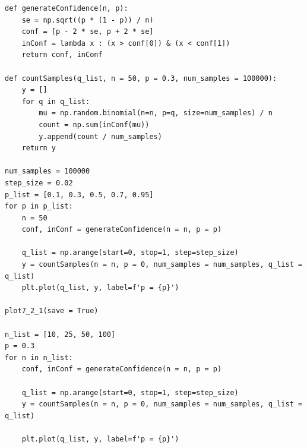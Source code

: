 \documentclass{article}
\begin{document}
\begin{enumerate}
\begin{itemize}
\begin{verbatim}
def generateConfidence(n, p):
    se = np.sqrt((p * (1 - p)) / n)
    conf = [p - 2 * se, p + 2 * se]
    inConf = lambda x : (x > conf[0]) & (x < conf[1])
    return conf, inConf

def countSamples(q_list, n = 50, p = 0.3, num_samples = 100000):
    y = []
    for q in q_list:
        mu = np.random.binomial(n=n, p=q, size=num_samples) / n
        count = np.sum(inConf(mu))
        y.append(count / num_samples)
    return y

num_samples = 100000
step_size = 0.02
p_list = [0.1, 0.3, 0.5, 0.7, 0.95]
for p in p_list:
    n = 50
    conf, inConf = generateConfidence(n = n, p = p)

    q_list = np.arange(start=0, stop=1, step=step_size)
    y = countSamples(n = n, p = 0, num_samples = num_samples, q_list = q_list)
    plt.plot(q_list, y, label=f'p = {p}')

plot7_2_1(save = True)

n_list = [10, 25, 50, 100]
p = 0.3
for n in n_list:
    conf, inConf = generateConfidence(n = n, p = p)

    q_list = np.arange(start=0, stop=1, step=step_size)
    y = countSamples(n = n, p = 0, num_samples = num_samples, q_list = q_list)

    plt.plot(q_list, y, label=f'p = {p}')


\end{verbatim}
\end{itemize}
\end{enumerate}
\end{document}
